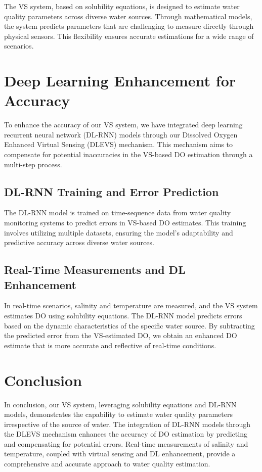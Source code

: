 \documentclass[a4paper, 11pt]{article}
\begin{document}
	The VS system, based on solubility equations, is designed to estimate water quality parameters across diverse water sources. Through mathematical models, the system predicts parameters that are challenging to measure directly through physical sensors. This flexibility ensures accurate estimations for a wide range of scenarios.
	
	\section*{Deep Learning Enhancement for Accuracy}
	
	To enhance the accuracy of our VS system, we have integrated deep learning recurrent neural network (DL-RNN) models through our Dissolved Oxygen Enhanced Virtual Sensing (DLEVS) mechanism. This mechanism aims to compensate for potential inaccuracies in the VS-based DO estimation through a multi-step process.
	
	\subsection*{DL-RNN Training and Error Prediction}
	
	The DL-RNN model is trained on time-sequence data from water quality monitoring systems to predict errors in VS-based DO estimates. This training involves utilizing multiple datasets, ensuring the model's adaptability and predictive accuracy across diverse water sources.
	
	\subsection*{Real-Time Measurements and DL Enhancement}
	
	In real-time scenarios, salinity and temperature are measured, and the VS system estimates DO using solubility equations. The DL-RNN model predicts errors based on the dynamic characteristics of the specific water source. By subtracting the predicted error from the VS-estimated DO, we obtain an enhanced DO estimate that is more accurate and reflective of real-time conditions.
	
	\section*{Conclusion}
	
	In conclusion, our VS system, leveraging solubility equations and DL-RNN models, demonstrates the capability to estimate water quality parameters irrespective of the source of water. The integration of DL-RNN models through the DLEVS mechanism enhances the accuracy of DO estimation by predicting and compensating for potential errors. Real-time measurements of salinity and temperature, coupled with virtual sensing and DL enhancement, provide a comprehensive and accurate approach to water quality estimation.
	
\end{document}
